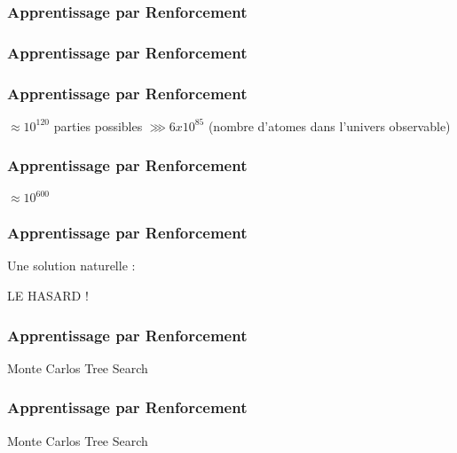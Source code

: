 \documentclass{formation}
\begin{document}
\begin{frame}
  \frametitle{Apprentissage par Renforcement}
\end{frame}

\begin{frame}
  \frametitle{Apprentissage par Renforcement}
  \begin{center}
  \end{center}
\end{frame}

\begin{frame}
  \frametitle{Apprentissage par Renforcement}
  \begin{center}
  \end{center}
  \begin{center}
    $\approx 10^{120}$ parties possibles $\ggg 6 x 10^{85}$
    \newline
    (nombre d'atomes dans l'univers observable)
  \end{center}
\end{frame}

\begin{frame}
  \frametitle{Apprentissage par Renforcement}
  \begin{center}
    \huge{$\approx 10^{600}$}
  \end{center}
\end{frame}

\begin{frame}
  \frametitle{Apprentissage par Renforcement}
  \huge Une solution naturelle :
  \newline
  \begin{center}
  \huge LE HASARD !
  \end{center}
\end{frame}

\begin{frame}
  \frametitle{Apprentissage par Renforcement}
  Monte Carlos Tree Search
\end{frame}

\begin{frame}
  \frametitle{Apprentissage par Renforcement}
  Monte Carlos Tree Search
\end{frame}
\end{document}
